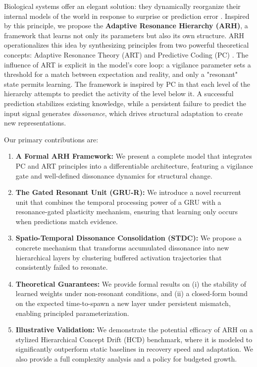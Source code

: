 \documentclass{article}
\begin{document}
Biological systems offer an elegant solution: they dynamically reorganize their internal models of the world in response to surprise or prediction error \citep{Piaget1954}. Inspired by this principle, we propose the \textbf{Adaptive Resonance Hierarchy (ARH)}, a framework that learns not only its parameters but also its own structure. ARH operationalizes this idea by synthesizing principles from two powerful theoretical concepts: Adaptive Resonance Theory (ART) \citep{Grossberg1987} and Predictive Coding (PC) \citep{Rao1999}. The influence of ART is explicit in the model's core loop: a vigilance parameter sets a threshold for a match between expectation and reality, and only a "resonant" state permits learning. The framework is inspired by PC in that each level of the hierarchy attempts to predict the activity of the level below it. A successful prediction stabilizes existing knowledge, while a persistent failure to predict the input signal generates \emph{dissonance}, which drives structural adaptation to create new representations.

Our primary contributions are:
\begin{enumerate}
    \item \textbf{A Formal ARH Framework:} We present a complete model that integrates PC and ART principles into a differentiable architecture, featuring a vigilance gate and well-defined dissonance dynamics for structural change.
    \item \textbf{The Gated Resonant Unit (GRU-R):} We introduce a novel recurrent unit that combines the temporal processing power of a GRU with a resonance-gated plasticity mechanism, ensuring that learning only occurs when predictions match evidence.
    \item \textbf{Spatio-Temporal Dissonance Consolidation (STDC):} We propose a concrete mechanism that transforms accumulated dissonance into new hierarchical layers by clustering buffered activation trajectories that consistently failed to resonate.
    \item \textbf{Theoretical Guarantees:} We provide formal results on (i) the stability of learned weights under non-resonant conditions, and (ii) a closed-form bound on the expected time-to-spawn a new layer under persistent mismatch, enabling principled parameterization.
    \item \textbf{Illustrative Validation:} We demonstrate the potential efficacy of ARH on a stylized Hierarchical Concept Drift (HCD) benchmark, where it is modeled to significantly outperform static baselines in recovery speed and adaptation. We also provide a full complexity analysis and a policy for budgeted growth.
\end{enumerate}
\end{document}
